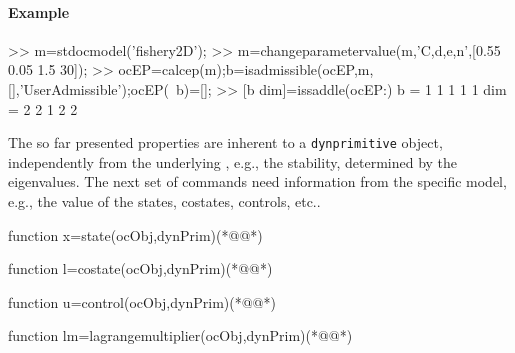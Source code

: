 \paragraph{Example}
\begin{matlab}
>> m=stdocmodel('fishery2D');
>> m=changeparametervalue(m,'C,d,e,n',[0.55 0.05 1.5 30]);
>> ocEP=calcep(m);b=isadmissible(ocEP,m,[],'UserAdmissible');ocEP(~b)=[];
>> [b dim]=issaddle(ocEP{:})
b =
     1     1     1     1     1
dim =
     2     2     1     2     2
\end{matlab}
The so far presented properties are inherent to a \lstinline+dynprimitive+ object, independently from the underlying \OCMOD, e.g., the stability, determined by the eigenvalues. The next set of commands need information from the specific model, e.g., the value of the states, costates, controls, etc..
\begin{matlab}
function x=state(ocObj,dynPrim)(*@@*)
%
% 
\end{matlab}
\begin{matlab}
function l=costate(ocObj,dynPrim)(*@@*)
%
% 
\end{matlab}
\begin{matlab}
function u=control(ocObj,dynPrim)(*@@*)
%
% 
\end{matlab}
\begin{matlab}
function lm=lagrangemultiplier(ocObj,dynPrim)(*@@*)
%
% 
\end{matlab}
